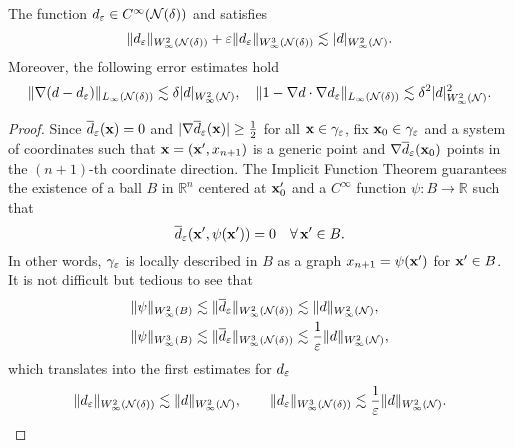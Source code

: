 \begin{lemma}\label{L:properties-Pe}
The function $d_\varepsilon\in C^\infty(\mathcal N(\delta))$ and satisfies
%
\[
\|d_\varepsilon\|_{W^2_\infty({\mathcal N(\delta)})}
+ \varepsilon \|d_\varepsilon\|_{W^3_\infty({\mathcal N(\delta)})}  \lesssim |d|_{W^2_\infty(\mathcal N)}.
\]
%
Moreover, the following error estimates hold
$$
\|\nabla(d-d_\varepsilon)\|_{L_\infty(\mathcal N(\delta))}
  \lesssim \delta |d|_{W^2_\infty(\mathcal{N})},
\quad
\| 1 - \nabla d \cdot \nabla d_\varepsilon \|_{L_\infty(\mathcal N(\delta))}
\lesssim \delta^2 |d|_{W^2_\infty(\mathcal{N})}^2.
$$
%
\end{lemma}
%
\begin{proof}
Since $\overline{d}_\varepsilon({\bf x})=0$ and $|\nabla\overline{d}_\varepsilon({\bf x})|\ge\frac12$
for all ${\bf x}\in{\gamma_\varepsilon}$, fix ${\bf x}_0\in{\gamma_\varepsilon}$ and a system of coordinates such that
${\bf x} = ({\bf x}',x_{n+1})$ is a generic point and $\nabla\overline{d}_\varepsilon({\bf x}_0)$ points in the
$(n+1)$-th coordinate direction. The Implicit Function Theorem guarantees the existence
of a ball $B$ in $\mathbb{R}^n$ centered at ${\bf x}_0'$ and a $C^\infty$ function
$\psi:B\to\mathbb{R}$ such that
%
\[
\overline{d}_\varepsilon({\bf x}',\psi({\bf x}')) = 0
\quad\forall \, {\bf x}'\in B.
\]
%
In other words, ${\gamma_\varepsilon}$ is locally described in $B$ as a graph $x_{n+1}=\psi({\bf x}')$
for ${\bf x}'\in B$. It is not difficult but tedious to see that
%
\begin{align*}
\|\psi\|_{W^2_\infty(B)} &\lesssim \|\overline{d}_\varepsilon\|_{W^2_\infty({{\mathcal{N}(\delta)}})}
\lesssim \|d\|_{W^2_\infty(\mathcal N)},
\\
\|\psi\|_{W^3_\infty(B)} &\lesssim \|\overline{d}_\varepsilon\|_{W^3_\infty({{\mathcal{N}(\delta)}})}
\lesssim \frac{1}{\varepsilon} \|d\|_{W^2_\infty(\mathcal N)},
\end{align*}
which translates into the first estimates for $d_\varepsilon$
%
\[
\|d_\varepsilon\|_{W^2_\infty({\mathcal{N}(\delta)})} \lesssim \|d\|_{W^2_\infty(\mathcal N)},
\qquad
\|d_\varepsilon\|_{W^3_\infty({\mathcal{N}(\delta)})} \lesssim \frac{1}{\varepsilon}\|d\|_{W^2_\infty(\mathcal N)}.
\]
%


\end{proof}
